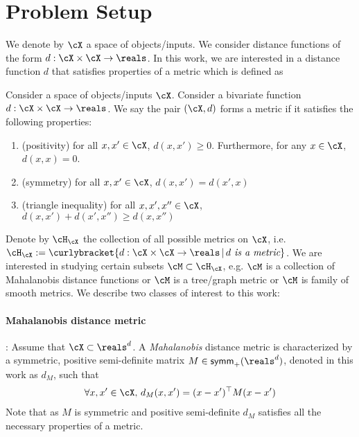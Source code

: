 \section{Problem Setup}
We denote by $\cX$ a space of objects/inputs. We consider distance functions of the form $d: \cX \times \cX \to \reals$. In this work, we are interested in a distance function $d$ that satisfies properties of a metric which is defined as
\begin{definition}
    Consider a space of objects/inputs $\cX$. Consider a bivariate function $d: \cX \times \cX \to \reals$. We say the pair $(\cX,d)$ forms a metric if it satisfies the following properties:
    \begin{enumerate}
        \item (positivity) for all $x,x' \in \cX$, $d(x,x') \ge 0$. Furthermore, for any $x \in \cX$, $d(x,x) = 0$.
        \item (symmetry) for all $x,x' \in \cX$, $d(x,x') = d(x',x)$
        \item (triangle inequality) for all $x,x',x'' \in \cX$, $d(x,x') + d(x',x'') \ge d(x,x'')$
    \end{enumerate}
\end{definition}
Denote by $\cH_{\cX}$ the collection of all possible metrics on $\cX$, i.e. $\cH_{\cX} := \curlybracket{d: \cX\times \cX \to \reals \, |\, d \textit{ is a metric}}$. We are interested in studying certain subsets $\cM \subset \cH_{\cX}$, e.g. $\cM$ is a collection of Mahalanobis distance functions or $\cM$ is a tree/graph metric or $\cM$ is family of smooth metrics. We describe two classes of interest to this work:

\paragraph{Mahalanobis distance metric}: Assume that $\cX \subset \reals^d$. A \textit{Mahalanobis} distance metric is characterized by a symmetric, positive semi-definite matrix $M \in \textsf{symm}_{+}(\reals^d)$, denoted in this work as $d_M$, such that 
\begin{align}
    \forall x,x' \in \cX,\, d_M(x,x') = (x-x')^{\top}M(x-x') \label{eq: maha}
\end{align}
Note that as $M$ is symmetric and positive semi-definite $d_M$ satisfies all the necessary properties of a metric. 

